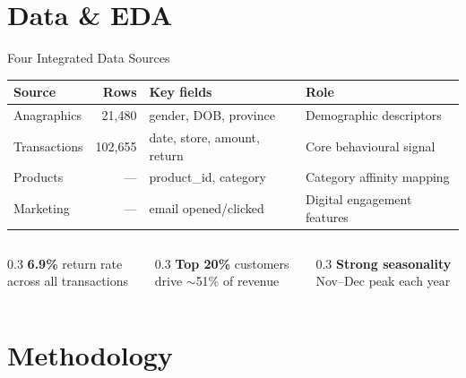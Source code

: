 \documentclass[aspectratio=169,10pt]{beamer}
\begin{document}
\section{Data \& EDA}

\begin{frame}{Four Integrated Data Sources}
\centering\small
\begin{tabular}{@{}lrp{3.2cm}p{5.2cm}@{}}
\toprule
\textbf{Source} & \textbf{Rows} & \textbf{Key fields} & \textbf{Role} \\
\midrule
Anagraphics  & 21{,}480  & gender, DOB, province         & Demographic descriptors \\[2pt]
Transactions & 102{,}655 & date, store, amount, return   & Core behavioural signal \\[2pt]
Products     & ---       & product\_id, category         & Category affinity mapping \\[2pt]
Marketing    & ---       & email opened/clicked          & Digital engagement features \\
\bottomrule
\end{tabular}

\vspace{0.8em}
\begin{columns}[c]
  \begin{column}{0.3\textwidth}\centering
    \textbf{6.9\%} return rate\\{\footnotesize across all transactions}
  \end{column}
  \begin{column}{0.3\textwidth}\centering
    \textbf{Top 20\%} customers\\{\footnotesize drive $\sim$51\% of revenue}
  \end{column}
  \begin{column}{0.3\textwidth}\centering
    \textbf{Strong seasonality}\\{\footnotesize Nov--Dec peak each year}
  \end{column}
\end{columns}
\end{frame}

\section{Methodology}
\end{document}
